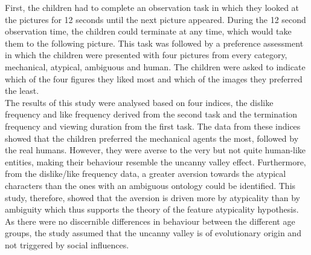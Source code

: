 First, the children had to complete an observation task in which they looked at the pictures for 12 seconds until the next picture appeared. During the 12 second observation time, the children could terminate at any time, which would take them to the following picture. This task was followed by a preference assessment in which the children were presented with four pictures from every category, mechanical, atypical, ambiguous  and human. The children were asked to indicate which of the four figures they liked most and which of the images they preferred the least.\\
The results of this study were analysed based on four indices, the dislike frequency and like frequency derived from the second task and the termination frequency and viewing duration from the first task.
The data from these indices showed that the children preferred the mechanical agents the most, followed by the real humans. 
However, they were averse to the very but not quite human-like entities, making their behaviour resemble the uncanny valley effect. Furthermore, from the dislike/like frequency data, a greater aversion towards the atypical characters than the ones with an ambiguous ontology could be identified. This study, therefore, showed that the aversion is driven more by atypicality than by ambiguity which thus supports the theory of the feature atypicality hypothesis. As there were no discernible differences in behaviour between the different age groups, the study assumed that the uncanny valley is of evolutionary origin and not triggered by social influences.\\

